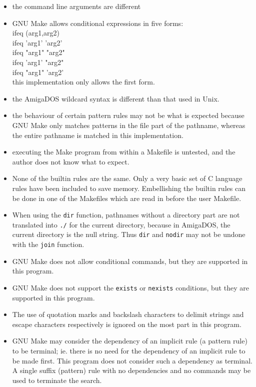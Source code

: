 \begin{itemize}
\item the command line arguments are different
\item GNU Make allows conditional expressions in five forms: \\
		ifeq (arg1,arg2) \\
		ifeq 'arg1' 'arg2'\\
		ifeq "arg1" "arg2" \\
		ifeq 'arg1' "arg2" \\
		ifeq "arg1" 'arg2' \\
		this implementation only allows the first form.
\item the AmigaDOS wildcard syntax is different than that used in Unix.
\item the behaviour of certain pattern rules may not be what is
		expected because GNU Make only matches patterns in the file part
		of the pathname, whereas the entire pathname is matched in this
		implementation.
\item executing the Make program from within a Makefile is untested,
		and the author does not know what to expect.
\item None of the builtin rules are the same.  Only a very basic set
		of C language rules have been included to save memory.
		Embellishing the builtin rules can be done in one of the Makefiles
		which are read in before the user Makefile.
\item When using the {\tt dir} function, pathnames without a directory
		part are not translated into {\tt ./} for the current directory,
		because in AmigaDOS, the current directory is the null string.
		Thus {\tt dir} and {\tt nodir} may not be undone with the
		{\tt join} function.
\item GNU Make does not allow conditional commands, but they are
		supported in this program.
\item GNU Make does not support the {\tt exists} or {\tt nexists}
		conditions, but they are supported in this program.
\item The use of quotation marks and backslash characters to delimit
		strings and escape characters respectively is ignored on the most
		part in this program.
\item GNU Make may consider the dependency of an implicit rule (a
		pattern rule) to be terminal; ie. there is no need for the
		dependency of an implicit rule to be made first.  This program
		does not consider such a dependency as terminal.  A single
		suffix (pattern) rule with no dependencies and no commands may
		be used to terminate the search.
\end{itemize}



